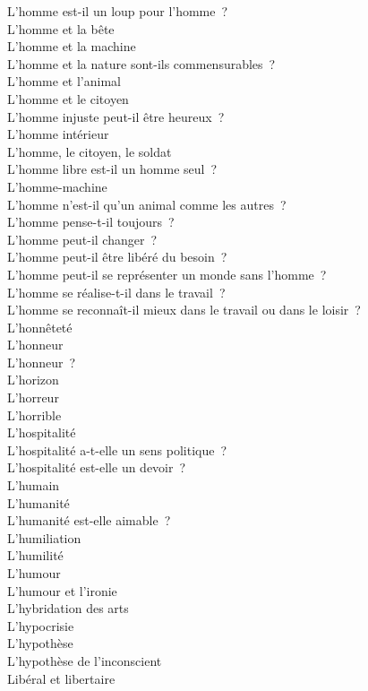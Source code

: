 \documentclass[a4paper,12pt]{article}
\begin{document}
L'homme est-il un loup pour l'homme ? \\
L'homme et la bête \\
L'homme et la machine \\
L'homme et la nature sont-ils commensurables ? \\
L'homme et l'animal \\
L'homme et le citoyen \\
L'homme injuste peut-il être heureux ? \\
L'homme intérieur \\
L'homme, le citoyen, le soldat \\
L'homme libre est-il un homme seul ? \\
L'homme-machine \\
L'homme n'est-il qu'un animal comme les autres ? \\
L'homme pense-t-il toujours ? \\
L'homme peut-il changer ? \\
L'homme peut-il être libéré du besoin ? \\
L'homme peut-il se représenter un monde sans l'homme ? \\
L'homme se réalise-t-il dans le travail ? \\
L'homme se reconnaît-il mieux dans le travail ou dans le loisir ? \\
L'honnêteté \\
L'honneur \\
L'honneur ? \\
L'horizon \\
L'horreur \\
L'horrible \\
L'hospitalité \\
L'hospitalité a-t-elle un sens politique ? \\
L'hospitalité est-elle un devoir ? \\
L'humain \\
L'humanité \\
L'humanité est-elle aimable ? \\
L'humiliation \\
L'humilité \\
L'humour \\
L'humour et l'ironie \\
L'hybridation des arts \\
L'hypocrisie \\
L'hypothèse \\
L'hypothèse de l'inconscient \\
Libéral et libertaire \\
\end{document}
